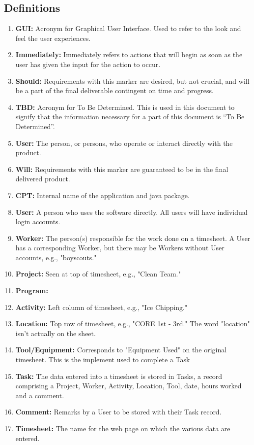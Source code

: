 \documentclass[12pt]{article}
\begin{document}
\subsection{Definitions}
\begin{enumerate}
\item \textbf{GUI:} Acronym for Graphical User Interface. Used to refer to the look and feel the user experiences.
\item \textbf{Immediately:} Immediately refers to actions that will begin as soon as the user has given the input for the action to occur.
\item \textbf{Should:} Requirements with this marker are desired, but not crucial, and will be a part of the final deliverable contingent on time and progress.
\item \textbf{TBD:} Acronym for To Be Determined. This is used in this document to signify that the information necessary for a part of this document is ``To Be Determined''.
\item \textbf{User:} The person, or persons, who operate or interact directly with the product.
\item \textbf{Will:} Requirements with this marker are guaranteed to be in the final delivered product.
\item \textbf{CPT:} Internal name of the application and java package.
\item \textbf{User:} A person who uses the software directly. All users will have individual login accounts.
\item \textbf{Worker:} The person(s) responsible for the work done on a timesheet. A User has a corresponding Worker, but there may be Workers without User accounts, e.g., "boyscouts."
\item \textbf{Project:} Seen at top of timesheet, e.g., "Clean Team."
\item \textbf{Program:} 
\item \textbf{Activity:} Left column of timesheet, e.g., "Ice Chipping."
\item \textbf{Location:} Top row of timesheet, e.g., "CORE 1st - 3rd." The word "location" isn't actually on the sheet.
\item \textbf{Tool/Equipment:} Corresponds to "Equipment Used" on the original timesheet. This is the implement used to complete a Task
\item \textbf{Task:} The data entered into a timesheet is stored in Tasks, a record comprising a Project, Worker, Activity, Location, Tool, date, hours worked and a comment.
\item \textbf{Comment:} Remarks by a User to be stored with their Task record.
\item \textbf{Timesheet:} The name for the web page on which the various data are entered.
\end{enumerate}
\end{document}
